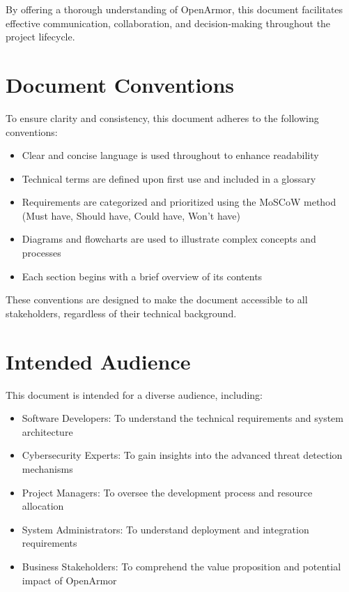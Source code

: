 By offering a thorough understanding of OpenArmor, this document facilitates effective communication, collaboration, and decision-making throughout the project lifecycle.

\section{Document Conventions}
To ensure clarity and consistency, this document adheres to the following conventions:

\begin{itemize}
    \item Clear and concise language is used throughout to enhance readability
    \item Technical terms are defined upon first use and included in a glossary
    \item Requirements are categorized and prioritized using the MoSCoW method (Must have, Should have, Could have, Won't have)
    \item Diagrams and flowcharts are used to illustrate complex concepts and processes
    \item Each section begins with a brief overview of its contents
\end{itemize}

These conventions are designed to make the document accessible to all stakeholders, regardless of their technical background.

\section{Intended Audience}
This document is intended for a diverse audience, including:

\begin{itemize}
    \item Software Developers: To understand the technical requirements and system architecture
    \item Cybersecurity Experts: To gain insights into the advanced threat detection mechanisms
    \item Project Managers: To oversee the development process and resource allocation
    \item System Administrators: To understand deployment and integration requirements
    \item Business Stakeholders: To comprehend the value proposition and potential impact of OpenArmor
\end{itemize}

